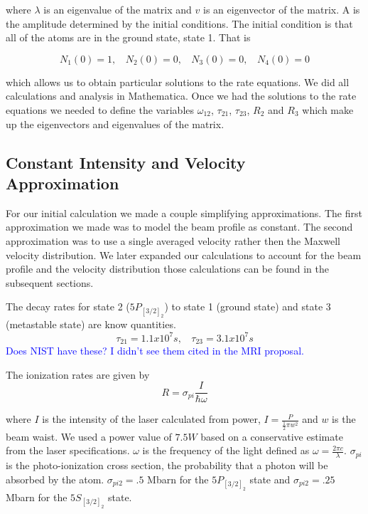 \documentclass[prb,preprint]{revtex4-1}
\begin{document}
where $\lambda$ is an eigenvalue of the matrix and $v$ is an eigenvector of the matrix.  A is the amplitude determined by the initial conditions. The initial condition is that all of the atoms are in the ground state, state 1. That is

\begin{equation}
\label{InitialCond}
N_1(0) = 1, \	\	\	\	
N_2(0) = 0, \	\	\	\	
N_3(0) = 0, \	\	\	\	
N_4(0) = 0 
\end{equation}

which allows us to obtain particular solutions to the rate equations. We did all calculations and analysis in Mathematica. Once we had the solutions to the rate equations we needed to define the variables $\omega_{12}$, $\tau_{21}$, $\tau_{23}$, $R_2$ and $R_3$ which make up the eigenvectors and eigenvalues of the matrix.

\subsection{Constant Intensity and Velocity Approximation} 

For our initial calculation we made a couple simplifying approximations. The first approximation we made was to model the beam profile as constant. The second approximation was to use a single averaged velocity rather then the Maxwell velocity distribution. We later expanded our calculations to account for the beam profile and the velocity distribution those calculations can be found in the subsequent sections. 

The decay rates for state 2 ($5P_{[3/2]_2}$) to state 1 (ground state) and state 3 (metastable state) are know quantities.
\begin{equation}
\label{DecayRates} 
\tau_{21} = 1.1x10^7 s, \	\	\	\	 \tau_{23} = 3.1x10^7s
\end{equation} 
\textcolor{blue}{Does NIST have these? I didn't see them cited in the MRI proposal.}

The ionization rates are given by 
\begin{equation}
\label{IonizationRates}
R = \sigma_{pi} \frac{I}{\hbar\omega}
\end{equation}

where $I$ is the intensity of the laser calculated from power, $I = \frac{P}{\frac{1}{2}\pi w^2}$ and $w$ is the beam waist. We used a power value of $7.5 W$ based on a conservative estimate from the laser specifications. $\omega$ is the frequency of the light defined as $\omega = \frac{2\pi c}{\lambda}$. $\sigma_{pi}$ is the photo-ionization cross section, the probability that a photon will be absorbed by the atom. $\sigma_{pi2} = .5$ Mbarn for the $5P_{[3/2]_2}$ state and $\sigma_{pi2} = .25$ Mbarn for the $5S_{[3/2]_2}$ state.~\cite{Cannon}
\end{document}

